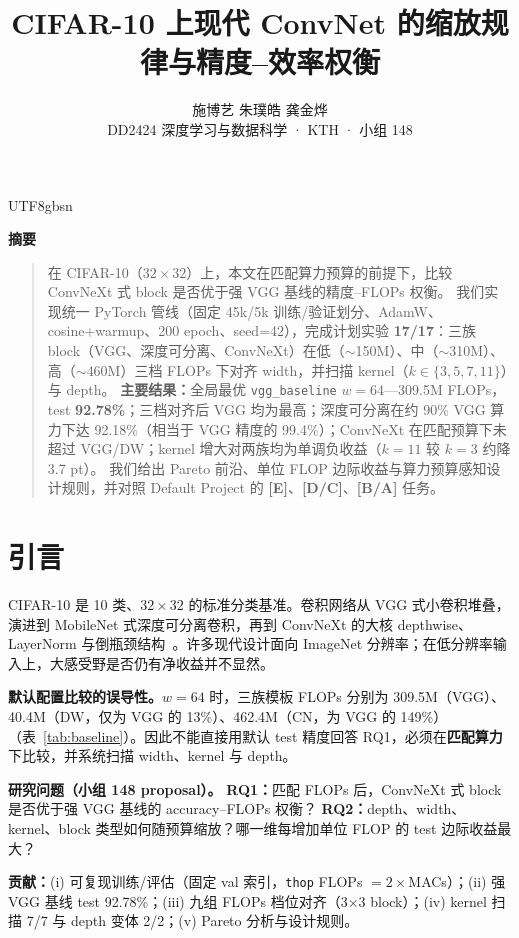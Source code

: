 \documentclass{article}
\title{CIFAR-10 上现代 ConvNet 的缩放规律与精度--效率权衡}
\author{%
  施博艺 \qquad 朱璞皓 \qquad 龚金烨 \\
  DD2424 深度学习与数据科学 · KTH · 小组 148 \\
}
\newcommand{\grade}[1]{\textbf{\textcolor{blue!70!black}{[#1]}}}
\renewenvironment{abstract}{%
  \centerline{\bfseries 摘要}\vspace{0.35em}\begin{quote}\small
}{%
  \end{quote}\vspace{0.6em}%
}
\begin{document}
\begin{CJK}{UTF8}{gbsn}

\maketitle

\begin{abstract}
  在 CIFAR-10（$32{\times}32$）上，本文在匹配算力预算的前提下，比较 ConvNeXt 式 block 是否优于强 VGG 基线的精度--FLOPs 权衡。
  我们实现统一 PyTorch 管线（固定 45k/5k 训练/验证划分、AdamW、cosine+warmup、200 epoch、seed=42），完成计划实验 \textbf{17/17}：三族 block（VGG、深度可分离、ConvNeXt）在低（$\sim$150M）、中（$\sim$310M）、高（$\sim$460M）三档 FLOPs 下对齐 width，并扫描 kernel（$k{\in}\{3,5,7,11\}$）与 depth。
  \textbf{主要结果：}全局最优 \texttt{vgg\_baseline} $w{=}64$---309.5M FLOPs，test \textbf{92.78\%}；三档对齐后 VGG 均为最高；深度可分离在约 90\% VGG 算力下达 92.18\%（相当于 VGG 精度的 99.4\%）；ConvNeXt 在匹配预算下未超过 VGG/DW；kernel 增大对两族均为单调负收益（$k{=}11$ 较 $k{=}3$ 约降 3.7 pt）。
  我们给出 Pareto 前沿、单位 FLOP 边际收益与算力预算感知设计规则，并对照 Default Project 的 \grade{E}、\grade{D/C}、\grade{B/A} 任务。
\end{abstract}

\section{引言}

CIFAR-10 是 10 类、$32{\times}32$ 的标准分类基准。卷积网络从 VGG 式小卷积堆叠，演进到 MobileNet 式深度可分离卷积，再到 ConvNeXt 的大核 depthwise、LayerNorm 与倒瓶颈结构~\cite{liu2022convnext}。许多现代设计面向 ImageNet 分辨率；在低分辨率输入上，大感受野是否仍有净收益并不显然。

\textbf{默认配置比较的误导性。}$w{=}64$ 时，三族模板 FLOPs 分别为 309.5M（VGG）、40.4M（DW，仅为 VGG 的 13\%）、462.4M（CN，为 VGG 的 149\%）（表~\ref{tab:baseline}）。因此不能直接用默认 test 精度回答 RQ1，必须在\textbf{匹配算力}下比较，并系统扫描 width、kernel 与 depth。

\textbf{研究问题（小组 148 proposal）。}
\textbf{RQ1：}匹配 FLOPs 后，ConvNeXt 式 block 是否优于强 VGG 基线的 accuracy--FLOPs 权衡？
\textbf{RQ2：}depth、width、kernel、block 类型如何随预算缩放？哪一维每增加单位 FLOP 的 test 边际收益最大？

\textbf{贡献：}(i) 可复现训练/评估（固定 val 索引，\texttt{thop} FLOPs $=2\times$MACs）；(ii) 强 VGG 基线 test 92.78\%；(iii) 九组 FLOPs 档位对齐（3$\times$3 block）；(iv) kernel 扫描 7/7 与 depth 变体 2/2；(v) Pareto 分析与设计规则。


\end{CJK}
\end{document}
